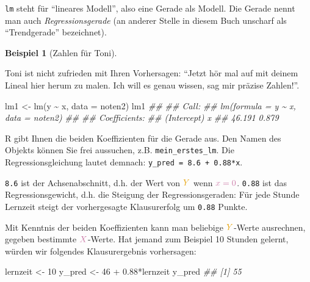 \documentclass[
  letterpaper,
  oneside,
  open=any]{scrbook}
\newenvironment{Shaded}{\begin{snugshade}}{\end{snugshade}}
\newcommand{\AttributeTok}[1]{\textcolor[rgb]{0.40,0.45,0.13}{#1}}
\newcommand{\DecValTok}[1]{\textcolor[rgb]{0.68,0.00,0.00}{#1}}
\newcommand{\DocumentationTok}[1]{\textcolor[rgb]{0.37,0.37,0.37}{\textit{#1}}}
\newcommand{\FloatTok}[1]{\textcolor[rgb]{0.68,0.00,0.00}{#1}}
\newcommand{\FunctionTok}[1]{\textcolor[rgb]{0.28,0.35,0.67}{#1}}
\newcommand{\NormalTok}[1]{\textcolor[rgb]{0.00,0.23,0.31}{#1}}
\newcommand{\OtherTok}[1]{\textcolor[rgb]{0.00,0.23,0.31}{#1}}
\newcommand{\SpecialCharTok}[1]{\textcolor[rgb]{0.37,0.37,0.37}{#1}}
\theoremstyle{definition}
\theoremstyle{definition}
\newtheorem{example}{Beispiel}[chapter]
\theoremstyle{definition}
\theoremstyle{remark}
\begin{document}
\texttt{lm} steht für \enquote{lineares Modell}, also eine Gerade als
Modell. Die Gerade nennt man auch \emph{Regressionsgerade} (an anderer
Stelle in diesem Buch unscharf als \enquote{Trendgerade} bezeichnet).

\begin{example}[Zahlen für
Toni]\protect\hypertarget{exm-noten5}{}\label{exm-noten5}

Toni ist nicht zufrieden mit Ihren Vorhersagen: \enquote{Jetzt hör mal
auf mit deinem Lineal hier herum zu malen. Ich will es genau wissen, sag
mir präzise Zahlen!}.

\end{example}

\begin{Shaded}
\begin{Highlighting}[]
\NormalTok{lm1 }\OtherTok{\textless{}{-}} \FunctionTok{lm}\NormalTok{(y }\SpecialCharTok{\textasciitilde{}}\NormalTok{ x, }\AttributeTok{data =}\NormalTok{ noten2)}
\NormalTok{lm1}
\DocumentationTok{\#\# }
\DocumentationTok{\#\# Call:}
\DocumentationTok{\#\# lm(formula = y \textasciitilde{} x, data = noten2)}
\DocumentationTok{\#\# }
\DocumentationTok{\#\# Coefficients:}
\DocumentationTok{\#\# (Intercept)            x  }
\DocumentationTok{\#\#      46.191        0.879}
\end{Highlighting}
\end{Shaded}

R gibt Ihnen die beiden Koeffizienten für die Gerade aus. Den Namen des
Objekts können Sie frei aussuchen, z.B. \texttt{mein\_erstes\_lm}. Die
Regressionsgleichung lautet demnach:
\texttt{y\_pred\ =\ 8.6\ +\ 0.88*x}.

\texttt{8.6} ist der Achsenabschnitt, d.h. der Wert von
\(\color{ycol}{Y}\) wenn \(\color{xcol}{x}=0\). \texttt{0.88} ist das
Regressionsgewicht, d.h. die Steigung der Regressionsgeraden: Für jede
Stunde Lernzeit steigt der vorhergesagte Klausurerfolg um \texttt{0.88}
Punkte.

Mit Kenntnis der beiden Koeffizienten kann man beliebige
\(\color{ycol}{Y}\)-Werte ausrechnen, gegeben bestimmte
\(\color{xcol}{X}\)-Werte. Hat jemand zum Beispiel 10 Stunden gelernt,
würden wir folgendes Klausurergebnis vorhersagen:

\begin{Shaded}
\begin{Highlighting}[]
\NormalTok{lernzeit }\OtherTok{\textless{}{-}} \DecValTok{10}
\NormalTok{y\_pred }\OtherTok{\textless{}{-}} \DecValTok{46} \SpecialCharTok{+} \FloatTok{0.88}\SpecialCharTok{*}\NormalTok{lernzeit}
\NormalTok{y\_pred}
\DocumentationTok{\#\# [1] 55}
\end{Highlighting}
\end{Shaded}
\end{document}
